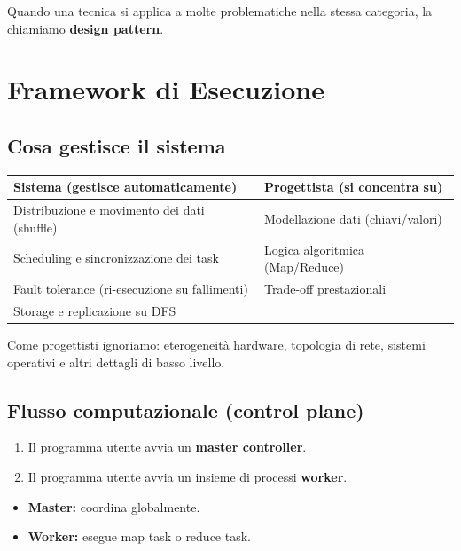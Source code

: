 Quando una tecnica si applica a molte problematiche nella stessa categoria,
la chiamiamo \textbf{design pattern}.

\newpage
\section{Framework di Esecuzione}

\subsection{Cosa gestisce il sistema}

\begin{tabular}{@{}ll@{}}
  \toprule
  \textbf{Sistema (gestisce automaticamente)} & \textbf{Progettista (si concentra su)} \\
  \midrule
  Distribuzione e movimento dei dati (shuffle) & Modellazione dati (chiavi/valori) \\
  Scheduling e sincronizzazione dei task       & Logica algoritmica (Map/Reduce) \\
  Fault tolerance (ri-esecuzione su fallimenti) & Trade-off prestazionali \\
  Storage e replicazione su DFS                &  \\
  \bottomrule
\end{tabular}

Come progettisti ignoriamo: eterogeneità hardware, topologia di rete,
sistemi operativi e altri dettagli di basso livello.

\subsection{Flusso computazionale (control plane)}

\begin{enumerate}
  \item Il programma utente avvia un \textbf{master controller}.
  \item Il programma utente avvia un insieme di processi \textbf{worker}.
\end{enumerate}

\begin{itemize}
  \item \textbf{Master:} coordina globalmente.
  \item \textbf{Worker:} esegue map task o reduce task.
\end{itemize}

